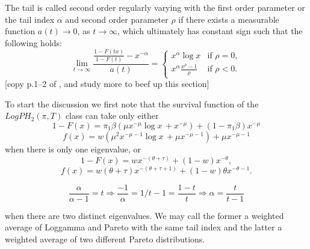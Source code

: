 \documentclass[11pt]{article}
\begin{document}
The tail is called second order regularly varying with the first order parameter or the tail index $\alpha$ and second order parameter $\rho$ if there exists a measurable function $a(t) \rightarrow 0$, as $t \rightarrow \infty$, which ultimately has constant sign such that the following holds:
\begin{equation}
\label{2nd.order.cond}
\lim_{t \rightarrow \infty}\frac{\frac{1-F(tx)}{1-F(t)}-x^{-\alpha}}{a(t)}=\begin{cases}
    x^{\alpha} \log x  & \text{if } \rho=0, \\
    x^{\alpha}\frac{x^\rho-1}{\rho}  & \text{if } \rho<0.
\end{cases}
\end{equation}
[copy p.1--2 of \cite{Geluk+De-Ha+etal:97a}, and study more to beef up this section]

To start the discussion we first note that the survival function of the $LogPH_2(\pi, T)$ class can take only either 
\begin{equation}
\label{ }
1-F(x)=\pi_1\beta (\mu x^{-\mu}\log x \, +x^{-\mu })+(1-\pi_1 \beta)x^{-\mu }
\end{equation}
$$
f(x)=w  ( \mu^2 x^{-\mu-1}\log x \, +\mu x^{-\mu -1})+\mu x^{-\mu -1}
$$
when there is only one eigenvalue, or
\begin{equation}
\label{F.case3}
1-F(x)=wx^{-(\theta+\tau)}+(1-w)x^{-\theta}, 
\end{equation} 
$$
f(x) = w (\theta+\tau) x^{-(\theta+\tau+1)}  + (1-w) \theta x^{-\theta-1}.
$$

$$
\frac{\alpha}{\alpha-1}=t \Rightarrow \frac{-1}{\alpha}=1/t-1 = \frac{1-t}{t} \Rightarrow \alpha = \frac{t}{t-1}
$$

when there are two distinct eigenvalues. We may call the former a weighted average of Loggamma and Pareto with the same tail index and the latter a weighted average of two different Pareto distributions.\\
\end{document}
